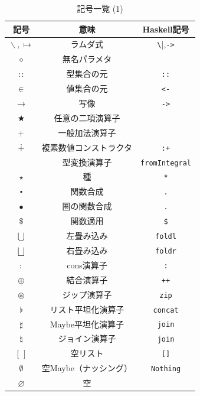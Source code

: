 \documentclass[a5paper,twoside,fleqn,draft]{jsbook}
\newcommand{\programminglanguage}[1]{\textsf{#1}}
\newcommand{\haskell}{\programminglanguage{Haskell}}
\newcommand{\code}[1]{\texttt{#1}}
\newcommand{\mEmptyList}{{[\,]}}
\newcommand{\mNothing}{\emptyset}
\newcommand{\mPureNothing}{\varnothing}
\newcommand{\mAnonParam}{\diamond}
\newcommand{\mUpCast}{\bigtriangleup}
\DeclareMathOperator{\mFromIntegral}{\mUpCast_\text{Integral}}
\DeclareMathOperator{\mAppend}{\oplus}
\DeclareMathOperator{\mApply}{\$}
\DeclareMathOperator{\mApplyRight}{\rightsquigarrow}
\DeclareMathOperator{\mBinOp}{\bigstar}
\DeclareMathOperator{\mCompFunc}{\centerdot}
\DeclareMathOperator{\mCompCat}{\bullet}
\DeclareMathOperator{\mComplexPlus}{\dotplus}
\DeclareMathOperator*{\mFold}{\bigcup}
\DeclareMathOperator*{\mFoldRight}{\bigsqcup}
\DeclareMathOperator{\mFuncArrow}{\rightarrow}
\DeclareMathOperator{\mIn}{{:\!:}}
\DeclareMathOperator{\mJoin}{\natural}
\DeclareMathOperator{\mJoinList}{\flat} %
\DeclareMathOperator{\mJoinMaybe}{\sharp}
\DeclareMathOperator{\mLambda}{\backslash}
\DeclareMathOperator{\mLambdaArrow}{\mapsto}
\DeclareMathOperator{\mPlus}{\bf{+}} %
\DeclareMathOperator{\mUnOp}{\star}
\DeclareMathOperator{\mZip}{\circledast}
\begin{document}
\begin{table}[p]
\caption{記号一覧 (1)}
\begin{center}
\begin{tabular}{||c|c|c||}
\hline
記号&意味&\haskell 記号\\
\hline\hline
$\mLambda, \mLambdaArrow$&ラムダ式&\verb|\|,\code{->}\\
$\mAnonParam$&無名パラメタ&\\
\hline
$\mIn$&型集合の元&\code{::}\\
$\in$&値集合の元&\code{<-}\\
$\mFuncArrow$&写像&\code{->}\\
\hline
$\mBinOp$&任意の二項演算子&\\
$\mPlus$&一般加法演算子&\\
\hline
$\mComplexPlus$&複素数値コンストラクタ&\code{:+}\\
\hline
$\mFromIntegral$&型変換演算子&\code{fromIntegral}\\
$\star$&種&\code{*}\\
\hline
$\mCompFunc$&関数合成&\code{.}\\
$\mCompCat$&圏の関数合成&\code{.}\\
$\mApply$&関数適用&\code{\$}\\
\hline
$\mFold$&左畳み込み&\code{foldl}\\
$\mFoldRight$&右畳み込み&\code{foldr}\\
\hline
$:$&cons演算子&\code{:}\\
$\mAppend$&結合演算子&\code{++}\\
$\mZip$&ジップ演算子&\code{zip}\\
\hline
$\mJoinList$&リスト平坦化演算子&\code{concat}\\
$\mJoinMaybe$&Maybe平坦化演算子&\code{join}\\
$\mJoin$&ジョイン演算子&\code{join}\\
\hline
$\mEmptyList$&空リスト&\code{[]}\\
$\mNothing$&空Maybe（ナッシング）&\code{Nothing}\\
$\mPureNothing$&空&\\
\hline
\end{tabular}
\end{center}
\end{table}
\end{document}
